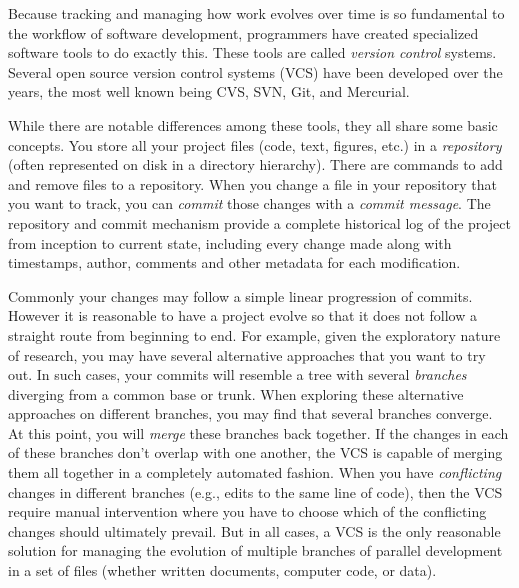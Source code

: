 \documentclass[ChapterTOCs,krantz2]{krantz} %
\begin{document}
Because tracking and managing how work evolves over time is so fundamental to
the workflow of software development, programmers have created specialized
software tools to do exactly this. These tools are called \emph{version
  control} systems. Several open source version control systems (VCS) have been
developed over the years, the most well known being CVS, SVN, Git, and
Mercurial.

While there are notable differences among these tools, they all share some
basic concepts.  You store all your project files (code,
text, figures, etc.) in a \emph{repository} (often represented on disk in a
directory hierarchy).  There are commands to add and remove files to a
repository.  When you change a file in your repository that you want to track,
you can \emph{commit} those changes with a \emph{commit message}.  The
repository and commit mechanism provide a complete historical log of the
project from inception to current state, including every change made along with
timestamps, author, comments and other metadata for each modification.

Commonly your changes may follow a simple linear progression of commits.
However it is reasonable to have a project evolve so that it does not follow a
straight route from beginning to end. For example, given the exploratory nature
of research, you may have several alternative approaches that you want to try
out. In such cases, your commits will resemble a tree with several
\emph{branches} diverging from a common base or trunk. When exploring these
alternative approaches on different branches, you may find that several
branches converge. At this point, you will \emph{merge} these
branches back together.  If the changes in each of these branches don't overlap
with one another, the VCS is capable of merging them all together in a
completely automated fashion.  When you have \emph{conflicting} changes in
different branches (e.g., edits to the same line of code), then the VCS
require manual intervention where you have to choose which of the conflicting
changes should ultimately prevail.  But in all cases, a VCS is the only
reasonable solution for managing the evolution of multiple branches of parallel
development in a set of files (whether written documents, computer code, or
data).
\end{document}
